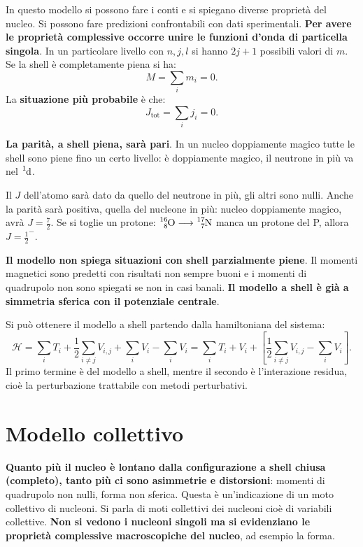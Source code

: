 \documentclass[a4paper,11pt,twoside,openany]{book}
\theoremstyle{definition}
\theoremstyle{plain}
\theoremstyle{plain}
\theoremstyle{definition}
\begin{document}
In questo modello si possono fare i conti e si spiegano diverse proprietà del nucleo. Si possono fare predizioni confrontabili con dati sperimentali. \textbf{Per avere le proprietà complessive occorre unire le funzioni d'onda di particella singola}. In un particolare livello con $n,j,l$ si hanno $2j+1$ possibili valori di $m$. Se la shell è completamente piena si ha:
\begin{equation}
M=\sum_im_i=0.
\end{equation}
La \textbf{situazione più probabile} è che:
\begin{equation}
J_\textrm{tot}=\sum_ij_i=0.
\end{equation}

\textbf{La parità, a shell piena, sarà pari}. In un nucleo doppiamente magico tutte le shell sono piene fino un certo livello:  è doppiamente magico,  il neutrone in più va nel $\ce{^1d}$.

Il $J$ dell'atomo sarà dato da quello del neutrone in più, gli altri sono nulli. Anche la parità sarà positiva, quella del nucleone in più:  nucleo doppiamente magico,  avrà $J=\frac{7}{2}$. Se si toglie un protone: $\ce{^{16}_{8}O} \longrightarrow \ce{^{17}_{7}N}$ manca un protone del P, allora $J=\frac{1}{2}^{-}$.

\textbf{Il modello non spiega situazioni con shell parzialmente piene}. Il momenti magnetici sono predetti con risultati non sempre buoni e i momenti di quadrupolo non sono spiegati se non in casi banali. \textbf{Il modello a shell è già a simmetria sferica con il potenziale centrale}.

Si può ottenere il modello a shell partendo dalla hamiltoniana del sistema:
\begin{equation}
\mathcal{H}=\sum_i{T_i}+\frac{1}{2}\sum_{i\neq j}{V_{i,j}}+\sum_i{V_i}-\sum_i{V_i}=\sum_i{T_i+V_i}+\left[\frac{1}{2}\sum_{i\neq j}{V_{i,j}}-\sum_i{V_i}\right].
\end{equation}
Il primo termine è del modello a shell, mentre il secondo è l'interazione residua, cioè la perturbazione trattabile con metodi perturbativi.

\section{Modello collettivo} %
\textbf{Quanto più il nucleo è lontano dalla configurazione a shell chiusa (completo), tanto più ci sono asimmetrie e distorsioni}: momenti di quadrupolo non nulli, forma non sferica. Questa è un'indicazione di un moto collettivo di nucleoni. Si parla di moti collettivi dei nucleoni cioè di variabili collettive. \textbf{Non si vedono i nucleoni singoli ma si evidenziano le proprietà complessive macroscopiche del nucleo}, ad esempio la forma.
\end{document}
